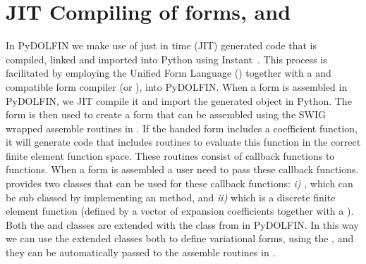 \section{JIT Compiling of \ufl forms,  and }
In PyDOLFIN we make use of just in time (JIT) generated \ufc code that is compiled, linked and imported into Python using Instant~\cite{WestlieMardalAlnaes2009}. This process is facilitated by employing the Unified Form Language (\ufl) together with a \ufl and \ufc compatible form compiler (\ffc or \sfc), into PyDOLFIN. When a \ufl form is assembled in PyDOLFIN, we JIT compile it and import the generated \ufc object in Python. The \ufc form is then used to create a \dolfin form that can be assembled using the SWIG wrapped assemble routines in \dolfin. If the handed \ufl form includes a coefficient function, it will generate \ufc code that includes routines to evaluate this function in the correct finite element function space. These routines consist of callback functions to \ufc functions. When a \ufc form is assembled a user need to pass these callback functions. \dolfin provides two classes that can be used for these callback functions: \textit{i)} , which can be sub classed by implementing an  method, and \textit{ii)}  which is a discrete finite element function (defined by a vector of expansion coefficients together with a ). Both the  and  classes are extended with the  class from \ufl in PyDOLFIN. In this way we can use the extended classes both to define variational forms, using the \ufl {}, and they can be automatically passed to the assemble routines in \dolfin. 

